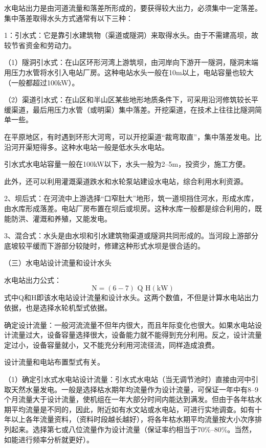 \documentclass{ctexbook}
\begin{document}
水电站出力是由河道流量和落差所形成的，要获得较大出力，必须集中一定落差。集中落差取得水头方式通常有以下三种：

1：引水式：它是靠引水建筑物（渠道或隧洞）来取得水头。由于不需建高坝，故较节省资金和劳动力。

（1）隧洞引水式：在山区环形河湾上游筑坝，由河岸向下游开一隧洞，隧洞末端用压力水管将水引入电站厂房。这种电站水头一般在10m以上，电站容量也较大（一般都超过100kW）。

（2）渠道引水式：在山区和半山区某些地形地质条件下，可采用沿河修筑较长平缓渠道，最后用压力水管（或明渠）集中落差。开挖渠道，在技术上往往比隧洞简单一些。

在平原地区，有时遇到环形大河弯，可以开挖渠道“裁弯取直”，集中落差发电。比沿河开渠短得多。这种水电站一般是低水头水电站。

引水式水电站容量一般在100kW以下，水头一般为2--5m，投资少，施工方便。

此外，还可以利用灌溉渠道跌水和水轮泵站建设水电站，综合利用水利资源。

2、坝后式：在河流中上游选择“口窄肚大”地形，筑一道坝挡住河水，形成水库，由水库形成落差。电站厂房布置在坝后或坝房。这种水库一般都是综合利用的，既能防洪、灌溉和养殖，又能发电。

3、混合式：水头是由水坝和引水建筑物渠道或隧洞共同形成的。当河段上游部分底坡较平缓而下游部分较陡时，修建这种形式水坝是很合适的。

（三）水电站设计流量和设计水头

水电站出力公式：
\begin{equation*}
\text{N}=(6-7)\text{ Q H} (\text{kW})	
\end{equation*}	
式中Q和H即该水电站设计流量和设计水头。这两个数值，不但是计算水电站出力依据，也是选择水轮机型式依据。

确定设计流量：一般河流流量不但年内很大，而且年际变化也很大。如果水电站设计流量过大，设备容量选择很大，设备能力就不能得到充分利用。反之，设计流量定过小，设备容量就小，又不能充分利用河流径流，同样造成浪费。

设计流量和电站布置型式有关。

（1）确定引水式水电站设计流量：引水式水电站（当无调节池时）直接由河中引取天然水量发电。一般是选择枯水期年均流量作为设计流量，可保证一年中有8--9个月流量大于设计流量，使机组在一年大部分时间内能达到满发。但由于各年枯水期平均流量是不同的，因此，附近如有水文站或水电站，可进行实地调查。如有十年以上各年流量资料，（资料时段越长越好），将各年枯水期平均流量按大小次序排列起来。选择第七或八位流量作为设计流量（保证率约相当于70\%--80\%。当然，如能进行频率分析就更好）。
\end{document}

